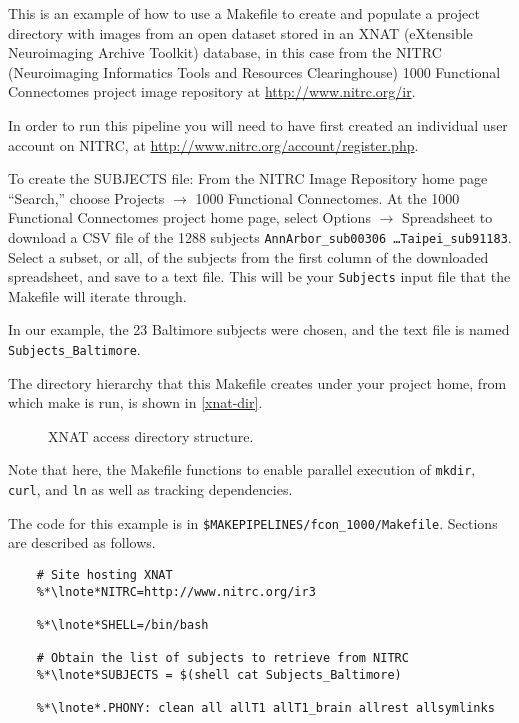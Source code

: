 \label{chap:XNAT}

This is an example of how to use a Makefile to create and populate a project directory with images from an open dataset stored in an XNAT (eXtensible Neuroimaging Archive Toolkit) database, in this case from the NITRC (Neuroimaging Informatics Tools and Resources Clearinghouse) 1000 Functional Connectomes project image repository at \url{http://www.nitrc.org/ir}. 

In order to run this pipeline you will need to have first created an individual user account on NITRC, at \url{http://www.nitrc.org/account/register.php}.

To create the SUBJECTS file: From the NITRC Image Repository home page ``Search,'' choose Projects $\rightarrow$ 1000 Functional Connectomes. At the 1000 Functional Connectomes project home page, select Options $\rightarrow$ Spreadsheet to download a CSV file of the 1288 subjects \texttt{AnnArbor_sub00306 \ldots Taipei_sub91183}. Select a subset, or all, of the subjects from the first column of the downloaded spreadsheet, and save to a text file. This will be your \texttt{Subjects} input file that the Makefile will iterate through.

In our example, the 23 Baltimore subjects were chosen, and the text file is named \texttt{Subjects_Baltimore}.

The directory hierarchy that this Makefile creates under your project home, from which make is run, is shown in \autoref{xnat-dir}.

\begin{figure}
	\caption{XNAT access directory structure.}
	\label{xnat-dir}
\end{figure}

Note that here, the Makefile functions to enable parallel execution of \texttt{mkdir}, \texttt{curl}, and \texttt{ln} as well as tracking dependencies. 

The code for this example is in \texttt{\$MAKEPIPELINES/fcon_1000/Makefile}. Sections are described as follows.

\begin{lstlisting}
	# Site hosting XNAT
	%*\lnote*NITRC=http://www.nitrc.org/ir3
	
	%*\lnote*SHELL=/bin/bash
	
	# Obtain the list of subjects to retrieve from NITRC
	%*\lnote*SUBJECTS = $(shell cat Subjects_Baltimore)

	%*\lnote*.PHONY: clean all allT1 allT1_brain allrest allsymlinks
\end{lstlisting}

